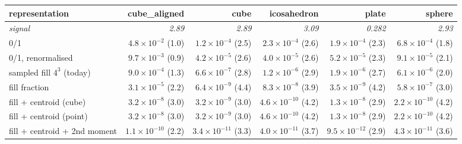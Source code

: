 \begin{tabular}{lrrrrr}
\toprule
representation & cube\_aligned & cube & icosahedron & plate & sphere \\
\midrule
\textit{signal} & \textit{2.89} & \textit{2.89} & \textit{3.09} & \textit{0.282} & \textit{2.93} \\
0/1 & $4.8\times10^{-2}$ (1.0) & $1.2\times10^{-4}$ (2.5) & $2.3\times10^{-4}$ (2.6) & $1.9\times10^{-4}$ (2.3) & $6.8\times10^{-4}$ (1.8) \\
0/1, renormalised & $9.7\times10^{-3}$ (0.9) & $4.2\times10^{-5}$ (2.6) & $4.0\times10^{-5}$ (2.6) & $5.2\times10^{-5}$ (2.3) & $9.1\times10^{-5}$ (2.1) \\
sampled fill $4^3$ (today) & $9.0\times10^{-4}$ (1.3) & $6.6\times10^{-7}$ (2.8) & $1.2\times10^{-6}$ (2.9) & $1.9\times10^{-6}$ (2.7) & $6.1\times10^{-6}$ (2.0) \\
fill fraction & $3.1\times10^{-5}$ (2.2) & $6.4\times10^{-9}$ (4.4) & $8.3\times10^{-8}$ (3.9) & $3.5\times10^{-9}$ (4.2) & $5.8\times10^{-7}$ (3.0) \\
fill + centroid (cube) & $3.2\times10^{-8}$ (3.0) & $3.2\times10^{-9}$ (3.0) & $4.6\times10^{-10}$ (4.2) & $1.3\times10^{-8}$ (2.9) & $2.2\times10^{-10}$ (4.2) \\
fill + centroid (point) & $3.2\times10^{-8}$ (3.0) & $3.2\times10^{-9}$ (3.0) & $4.6\times10^{-10}$ (4.2) & $1.3\times10^{-8}$ (2.9) & $2.2\times10^{-10}$ (4.2) \\
fill + centroid + 2nd moment & $1.1\times10^{-10}$ (2.2) & $3.4\times10^{-11}$ (3.3) & $4.0\times10^{-11}$ (3.7) & $9.5\times10^{-12}$ (2.9) & $4.3\times10^{-11}$ (3.6) \\
\bottomrule
\end{tabular}
